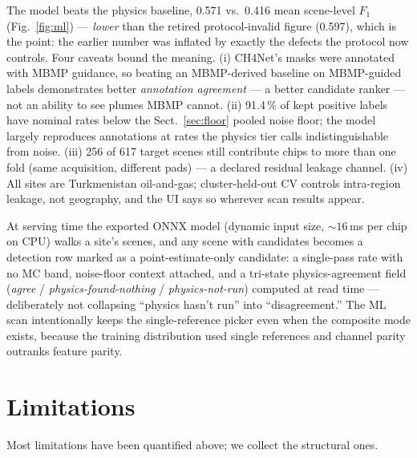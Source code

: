 \documentclass[11pt]{article}
\begin{document}
The model beats the physics baseline, 0.571 vs.\ 0.416 mean scene-level
$F_1$ (Fig.~\ref{fig:ml}) --- \emph{lower} than the retired protocol-invalid
figure (0.597), which is the point: the earlier number was
inflated by exactly the defects the protocol now controls. Four caveats
bound the meaning. (i) CH4Net's masks were annotated with MBMP guidance,
so beating an MBMP-derived baseline on MBMP-guided labels demonstrates
better \emph{annotation agreement} --- a better candidate ranker --- not
an ability to see plumes MBMP cannot. (ii) 91.4\,\% of kept positive
labels have nominal rates below the Sect.~\ref{sec:floor} pooled noise
floor; the model largely reproduces annotations at rates the physics tier
calls indistinguishable from noise. (iii) 256 of 617 target scenes still
contribute chips to more than one fold (same acquisition, different pads)
--- a declared residual leakage channel. (iv) All sites are Turkmenistan
oil-and-gas; cluster-held-out CV controls intra-region leakage, not
geography, and the UI says so wherever scan results appear.

At serving time the exported ONNX model (dynamic input size,
${\sim}16$\,ms per chip on CPU) walks a site's scenes, and any scene with
candidates becomes a detection row marked as a point-estimate-only
candidate: a single-pass rate with no MC band, noise-floor context
attached, and a tri-state physics-agreement field (\emph{agree} /
\emph{physics-found-nothing} / \emph{physics-not-run}) computed at read
time --- deliberately not collapsing ``physics hasn't run'' into
``disagreement.'' The ML scan intentionally keeps the single-reference
picker even when the composite mode exists, because the training
distribution used single references and channel parity outranks
feature parity.

\section{Limitations}\label{sec:limitations}

Most limitations have been quantified above; we collect the structural
ones.
\end{document}
